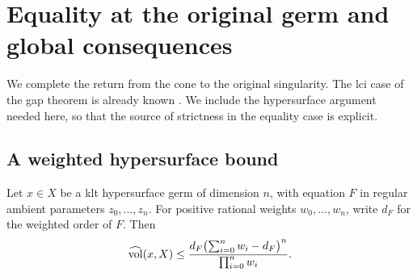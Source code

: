 \section{Equality at the original germ and global consequences}
\label{sec:conclusion}

We complete the return from the cone to the original singularity.
The lci case of the gap theorem is already known
\cite[Theorem~1.3]{Liu22}. We include the hypersurface argument
needed here, so that the source of strictness in the equality
case is explicit.

\subsection{A weighted hypersurface bound}

\begin{lemma}\label{end:hypersurface-test}
Let \(x\in X\) be a klt hypersurface germ of dimension \(n\),
with equation \(F\) in regular ambient parameters
\(z_0,\ldots,z_n\). For positive rational weights
\(w_0,\ldots,w_n\), write \(d_F\) for the weighted order of \(F\).
Then
\begin{equation}\label{end:eq-hypersurface-test}
 \widehat{\operatorname{vol}}(x,X)\le
           \frac{d_F\bigl(\sum_{i=0}^n w_i-d_F\bigr)^n}
                {\prod_{i=0}^n w_i}.
\end{equation}
\end{lemma}

